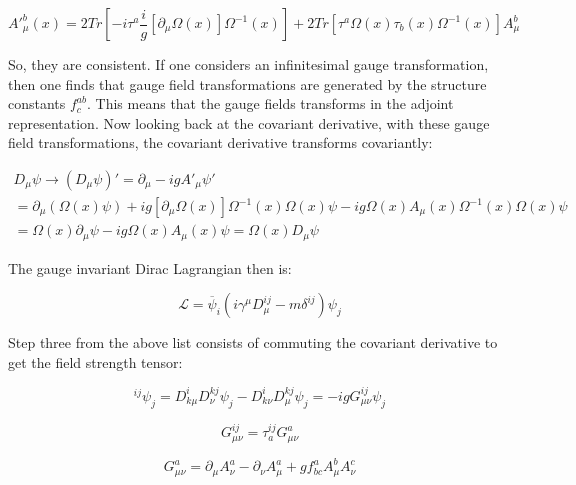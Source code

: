 \documentclass[a4]{article}
\begin{document}
    \begin{equation}
        A'^{b}_{\mu} (x) = 2 Tr [- i \tau^{a} \frac{i}{g} [\partial_{\mu} \Omega (x)] \Omega^{-1} (x)] + 2 Tr [\tau^{a} \Omega (x) \tau_{b} (x) \Omega^{-1} (x)] A_{\mu}^{b}
    \end{equation}

    So, they are consistent. If one considers an infinitesimal gauge transformation, then one finds that gauge field transformations are
    generated by the structure constants $f^{ab}_c$. This means that the gauge fields transforms in the adjoint representation. Now
    looking back at the covariant derivative, with these gauge field transformations, the covariant derivative transforms covariantly:

    \begin{equation}
        \begin{aligned}
            D_{\mu} \psi \rightarrow (D_{\mu} \psi)' = \partial_{\mu} - i g A'_{\mu} \psi' \\
            = \partial_{\mu} (\Omega (x) \psi) + i g [\partial_{\mu} \Omega (x)] \Omega ^{-1} (x) \Omega (x) \psi - i g \Omega (x) A_{\mu} (x) \Omega^{-1} (x) \Omega (x) \psi \\
            = \Omega (x) \partial_{\mu} \psi - i g \Omega (x) A_{\mu} (x) \psi = \Omega (x) D_{\mu} \psi
        \end{aligned}
    \end{equation}

    The gauge invariant Dirac Lagrangian then is:

    \begin{equation}
        \mathcal{L} = \overline{\psi}_{i} (i \gamma^{\mu} D_{\mu}^{ij} - m \delta^{ij}) \psi_{j}
    \end{equation}

    Step three from the above list consists of commuting the covariant derivative to get the field strength tensor:

    \begin{equation}
        [D_{\mu}, D_{\nu}]^{ij} \psi_{j} = D_{k \mu}^{i} D^{k j}_{\nu} \psi_{j} - D_{k \nu}^{i} D^{k j}_{\mu} \psi_{j} = - i g G_{\mu \nu}^{ij} \psi_{j}
    \end{equation}

    \begin{equation}
        G_{\mu \nu}^{ij} = \tau^{ij}_{a} G_{\mu \nu}^{a}
    \end{equation}

    \begin{equation}
        G_{\mu \nu}^{a} = \partial_{\mu} A^{a}_{\nu} - \partial_{\nu} A^{a}_{\mu} + g f^{a}_{bc} A^{b}_{\mu} A^{c}_{\nu}
    \end{equation}
\end{document}

